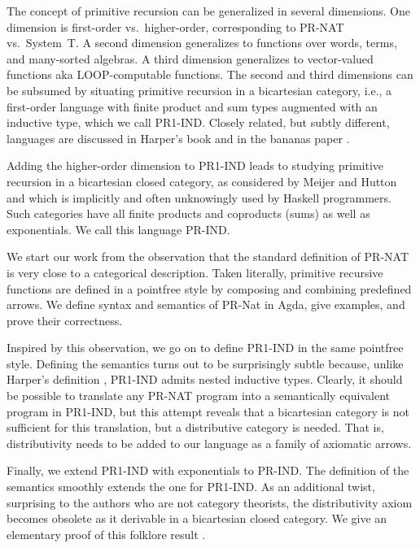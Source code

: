 \documentclass[a4paper,USenglish,cleveref, autoref, thm-restate]{lipics-v2021}
\begin{document}
The concept of primitive recursion can be generalized in several
dimensions. One dimension is first-order vs.\ higher-order,
corresponding to PR-NAT vs.\ System~T. A second dimension generalizes
to functions over words, terms, and many-sorted algebras. A third
dimension generalizes to vector-valued functions aka LOOP-computable
functions. The second and third dimensions can be subsumed by
situating primitive recursion in a bicartesian category, i.e., a
first-order language with finite product and sum types augmented with
an inductive type, which we call PR1-IND.  Closely related, but
subtly different, languages are discussed in Harper's book
\cite[Chapter 15]{DBLP:books/cu/Ha2016} and in the bananas paper
\cite{DBLP:conf/fpca/MeijerFP91}. 

Adding the higher-order dimension to PR1-IND leads to studying
primitive recursion in a bicartesian closed category, as considered
by Meijer and Hutton \cite{DBLP:conf/fpca/MeijerH95} and which is
implicitly and often unknowingly used by Haskell programmers. Such
categories have all finite products and coproducts (sums) as well as
exponentials. We call this language PR-IND.

We start our work from the observation that the standard definition of
PR-NAT is very close to a categorical description. Taken literally,
primitive recursive functions are defined in a pointfree style by
composing and combining predefined arrows. We define syntax and
semantics of PR-Nat in Agda, give examples, and prove their correctness.

Inspired by this observation, we go on to define PR1-IND in the same
pointfree style. Defining the semantics turns out to be surprisingly
subtle because, unlike Harper's definition \cite[Chapter
15]{DBLP:books/cu/Ha2016}, PR1-IND admits nested inductive types.
Clearly, it should be possible to translate any PR-NAT program into a
semantically equivalent program in PR1-IND, but this attempt reveals
that a bicartesian category is not sufficient for this translation,
but a distributive category is needed. That is, distributivity needs
to be added to our language as a family of axiomatic arrows.

Finally, we extend PR1-IND with exponentials to PR-IND. The definition
of the semantics smoothly extends the one for PR1-IND. As an
additional twist, surprising to the authors who are not category
theorists, the distributivity axiom becomes obsolete as it derivable in
a bicartesian closed category. We give an elementary proof of this
folklore result \cite{https://doi.org/10.48550/arxiv.1406.0961}. 
\end{document}
